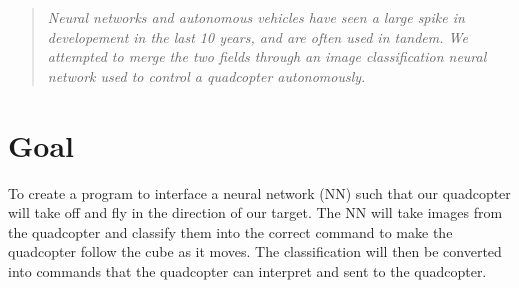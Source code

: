 \documentclass[12pt]{article}
\begin{document}
\maketitle

\begin{abstract}

{
	\it Neural networks and autonomous vehicles have seen a large spike in developement in the last 10 years, and are often used in tandem. We attempted to merge the two fields through an image classification neural network used to control a quadcopter autonomously. 
}

\end{abstract}

\mbox{}




\printnomenclature

\section{Goal}
{

	\quad To create a program to interface a neural network (NN) such that our quadcopter will take off and fly in the direction of our target. The NN will take images from the quadcopter and classify them into the correct command to make the quadcopter follow the cube as it moves.
	\quad The classification will then be converted into commands that the quadcopter can interpret and sent to the quadcopter.

}
\end{document}
